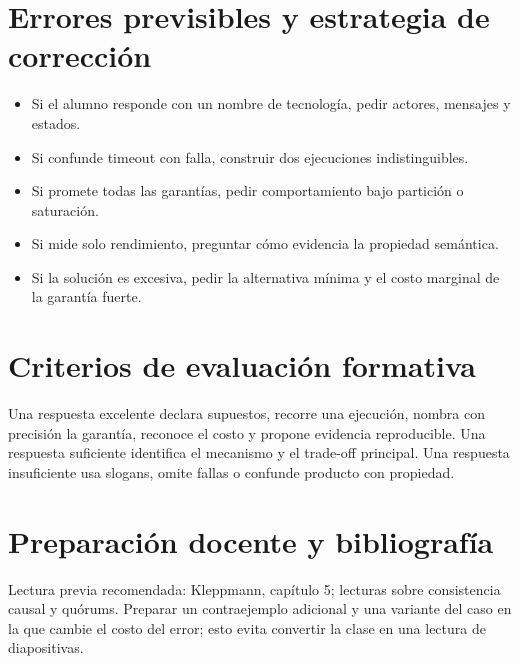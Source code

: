 \documentclass[variant=docente,cover=institutional,mode=screen]{ua-engineering-v6-article}
\begin{document}
\section{Errores previsibles y estrategia de corrección}
\begin{itemize}
\item Si el alumno responde con un nombre de tecnología, pedir actores, mensajes y estados.
\item Si confunde timeout con falla, construir dos ejecuciones indistinguibles.
\item Si promete todas las garantías, pedir comportamiento bajo partición o saturación.
\item Si mide solo rendimiento, preguntar cómo evidencia la propiedad semántica.
\item Si la solución es excesiva, pedir la alternativa mínima y el costo marginal de la garantía fuerte.
\end{itemize}

\section{Criterios de evaluación formativa}
Una respuesta excelente declara supuestos, recorre una ejecución, nombra con precisión la garantía, reconoce el costo y propone evidencia reproducible. Una respuesta suficiente identifica el mecanismo y el trade-off principal. Una respuesta insuficiente usa slogans, omite fallas o confunde producto con propiedad.

\section{Preparación docente y bibliografía}
Lectura previa recomendada: Kleppmann, capítulo 5; lecturas sobre consistencia causal y quórums. Preparar un contraejemplo adicional y una variante del caso en la que cambie el costo del error; esto evita convertir la clase en una lectura de diapositivas.
\end{document}

